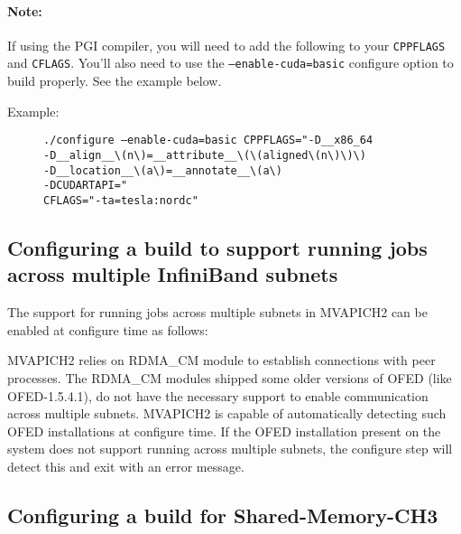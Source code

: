 \begin{small}
    \paragraph{Note:} If using the PGI compiler, you will need to add the
    following to your \texttt{CPPFLAGS} and \texttt{CFLAGS}.  You'll also need
    to use the \texttt{--enable-cuda=basic} configure option to build properly.
    See the example below.
    \begin{description}
        \item[Example:] \texttt{./configure --enable-cuda=basic
            CPPFLAGS="-D\_\_x86\_64 \\
            -D\_\_align\_\_\textbackslash(n\textbackslash)=\_\_attribute\_\_\textbackslash(\textbackslash(aligned\textbackslash(n\textbackslash)\textbackslash)\textbackslash) \\
            -D\_\_location\_\_\textbackslash(a\textbackslash)=\_\_annotate\_\_\textbackslash(a\textbackslash) \\
            -DCUDARTAPI="\\
            CFLAGS="-ta=tesla:nordc"}
    \end{description}
\end{small}

\subsection{Configuring a build to support running jobs across multiple
InfiniBand subnets}
\label{subsec:config-multi-subnet}

The support for running jobs across multiple subnets in MVAPICH2 can be enabled
at configure time as follows:


MVAPICH2 relies on RDMA\_CM module to establish connections with peer processes.
The RDMA\_CM modules shipped some older versions of OFED (like OFED-1.5.4.1), do
not have the necessary support to enable communication across multiple subnets.
MVAPICH2 is capable of automatically detecting such OFED installations at
configure time. If the OFED installation present on the system does not support
running across multiple subnets, the configure step will detect this and exit
with an error message.

\subsection{Configuring a build for Shared-Memory-CH3}
\label{subsec:config-gen2-shm}

